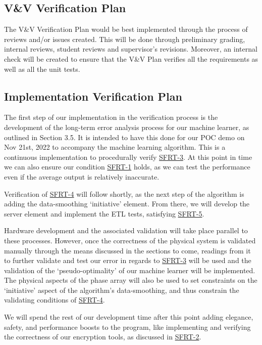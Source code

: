 \documentclass[12pt, titlepage]{article}
\begin{document}
\subsection{V\&V Verification Plan}
The V\&V Verification Plan would be best implemented through the process of reviews and/or issues created. This will be done through preliminary grading, internal reviews, student reviews and supervisor’s revisions. Moreover, an internal check will be created to ensure that the V\&V Plan verifies all the requirements as well as all the unit tests. 

\subsection{Implementation Verification Plan}

The first step of our implementation in the verification process is the development of the long-term error analysis process for our machine learner, as outlined in Section 3.5. It is intended to have this done for our POC demo on Nov 21st, 2022 to accompany the machine learning algorithm. This is a continuous implementation to procedurally verify \hyperlink{SFRT-3Anchor}{SFRT-3}. At this point in time we can also ensure our condition \hyperlink{SFRT-1Anchor}{SFRT-1} holds, as we can test the performance even if the average output is relatively inaccurate.

Verification of \hyperlink{SFRT-4Anchor}{SFRT-4} will follow shortly, as the next step of the algorithm is adding the data-smoothing ‘initiative’ element. From there, we will develop the server element and implement the ETL tests, satisfying \hyperlink{SFRT-5Anchor}{SFRT-5}. 

Hardware development and the associated validation will take place parallel to these processes. However, once the correctness of the physical system is validated manually through the means discussed in the sections to come, readings from it to further validate and test our error in regards to \hyperlink{SFRT-3Anchor}{SFRT-3} will be used and the validation of the ‘pseudo-optimality’ of our machine learner will be implemented. The physical aspects of the phase array will also be used to set constraints on the ‘initiative’ aspect of the algorithm’s data-smoothing, and thus constrain the validating conditions of \hyperlink{SFRT-4Anchor}{SFRT-4}. 

We will spend the rest of our development time after this point adding elegance, safety, and performance boosts to the program, like implementing and verifying the correctness of our encryption tools, as discussed in \hyperlink{SFRT-2Anchor}{SFRT-2}.
\end{document}
